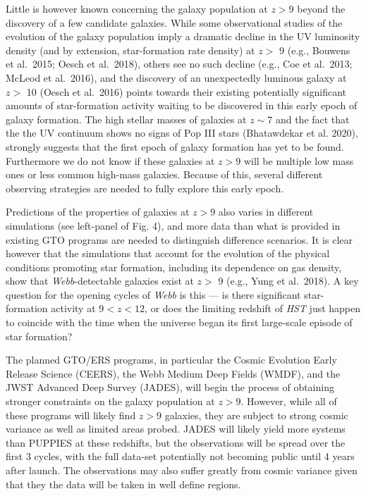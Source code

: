 \documentclass[12pt]{article}
\begin{document}
Little is however known concerning the galaxy population at $z > 9$ beyond the discovery of a few candidate galaxies.  While some observational studies of the evolution of the galaxy population imply a dramatic decline in the UV luminosity density (and by extension, star-formation rate density) at $z >$ 9 (e.g., Bouwens et al.\ 2015; Oesch et al.\ 2018), others see no such decline (e.g., Coe et al.\ 2013; McLeod et al.\ 2016), and the discovery of an unexpectedly luminous galaxy at $z >$ 10 (Oesch et al.\ 2016) points towards their existing potentially significant amounts of star-formation activity waiting to be discovered in this early epoch of galaxy formation.    The high stellar masses of galaxies at $z \sim 7$ and the fact that the the UV continuum shows no signs of Pop III stars (Bhatawdekar et al. 2020), strongly suggests that the first epoch of galaxy formation has yet to be found. Furthermore we do not know if these galaxies at $z > 9$ will be multiple low mass ones or less common high-mass galaxies.  Because of this, several different observing strategies are needed to fully explore this early epoch.

Predictions of the properties of galaxies at $z > 9$ also varies in different simulations (see left-panel of Fig. 4), and more data than what is provided in existing GTO programs are needed to distinguish difference scenarios. It is clear however that the simulations that account for the evolution of the physical conditions promoting star formation, including its dependence on gas density, show that {\it Webb}-detectable galaxies exist  at $z >$ 9 (e.g., Yung et al.\ 2018).  A key question for the opening cycles of {\it Webb} is this — is there significant star-formation activity at  $9<z<12$, or does the limiting redshift of {\it HST} just happen to coincide with the time when the universe began its first large-scale episode of star formation?

The planned GTO/ERS programs, in particular the Cosmic Evolution Early Release Science (CEERS), the Webb Medium Deep Fields (WMDF), and the JWST Advanced Deep Survey (JADES), will begin the process of obtaining stronger constraints on the galaxy population at $z>9$.   However, while all of these programs will likely find $z > 9$ galaxies, they are subject to strong cosmic variance as well as limited areas probed.  JADES will likely yield more systems than PUPPIES at these redshifts, but the observations will be spread over the first 3 cycles, with the full data-set potentially not becoming public until 4 years after launch.   The observations may also suffer greatly from cosmic variance given that they the data will be taken in well define regions.
\end{document}

